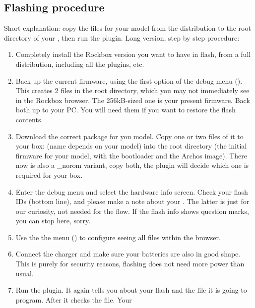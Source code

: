 \subsection{Flashing procedure}
Short explanation: copy the  files for your model from the
distribution to the root directory of your \dap, then run the 
 plugin.
Long version, step by step procedure:
\begin{enumerate}
\item Completely install the Rockbox version you want to have in flash, from a 
  full  distribution, including all the plugins, etc.
\item Back up the current firmware, using the first option of the debug menu 
  ().
  This creates 2 files in the root directory, which you may not immediately see 
  in the Rockbox browser. The 256kB-sized  one is your present firmware. Back  both up to your PC. You will need them if 
  you want to restore the flash contents.
\item Download the correct package for you model. Copy one or two files of it to 
  your box:  (name depends on your model) into the root 
  directory (the initial firmware for your model, with the bootloader and the 
  Archos image). There now is also a \_norom variant, copy both, the plugin will 
  decide which one is required for your box.
\item Enter the debug menu and select the hardware info screen. Check your flash 
  IDs (bottom line), and please make a note about your . The latter is just for our 
  curiosity, not needed for the flow. If the flash info shows question  marks, 
  you can stop here, sorry.
\item Use the the menu () to 
  configure seeing all files within the browser.
\item Connect the charger and make sure your batteries are also in good shape. 
  This is purely for security reasons, flashing does not need more power than usual.
\item Run the  plugin. It again tells you about your 
  flash and the file it is going to program. After  it checks the file. Your 

\end{enumerate}
